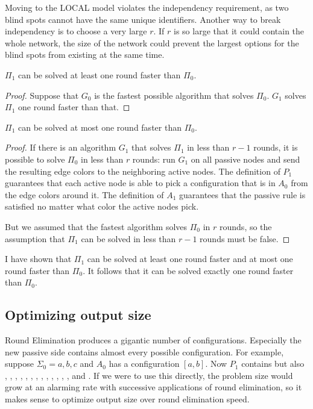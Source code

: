 \documentclass[english, 12pt, a4paper, sci, a-1b, online]{aaltothesis}
\begin{document}
Moving to the LOCAL model violates the independency requirement, as two blind spots cannot have the same unique identifiers. Another way to break independency is to choose a very large $r$. If $r$ is so large that it could contain the whole network, the size of the network could prevent the largest options for the blind spots from existing at the same time.

\begin{lemma}
  $\Pi_1$ can be solved at least one round faster than $\Pi_0$.
\end{lemma}
\begin{proof}
  Suppose that $G_0$ is the fastest possible algorithm that solves $\Pi_0$. $G_1$ solves $\Pi_1$ one round faster than that.
\end{proof}

\begin{lemma}
  $\Pi_1$ can be solved at most one round faster than $\Pi_0$.
\end{lemma}
\begin{proof}
  If there is an algorithm $G_1$ that solves $\Pi_1$ in less than $r-1$ rounds, it is possible to solve $\Pi_0$ in less than $r$ rounds: run $G_1$ on all passive nodes and send the resulting edge colors to the neighboring active nodes. The definition of $P_1$ guarantees that each active node is able to pick a configuration that is in $A_0$ from the edge colors around it. The definition of $A_1$ guarantees that the passive rule is satisfied no matter what color the active nodes pick.

  But we assumed that the fastest algorithm solves $\Pi_0$ in $r$ rounds, so the assumption that $\Pi_1$ can be solved in less than $r-1$ rounds must be false.
\end{proof}

I have shown that $\Pi_1$ can be solved at least one round faster and at most one round faster than $\Pi_0$. It follows that it can be solved exactly one round faster than $\Pi_0$.

\subsection{Optimizing output size}

Round Elimination produces a gigantic number of configurations. Especially the new passive side contains almost every possible configuration. For example, suppose $\Sigma_{0} = {a, b, c}$ and $A_0$ has a configuration $[a, b]$. Now $P_{1}$ contains  but also , , , , , , , , , , , , ,  and . If we were to use this directly, the problem size would grow at an alarming rate with successive applications of round elimination, so it makes sense to optimize output size over round elimination speed.
\end{document}
